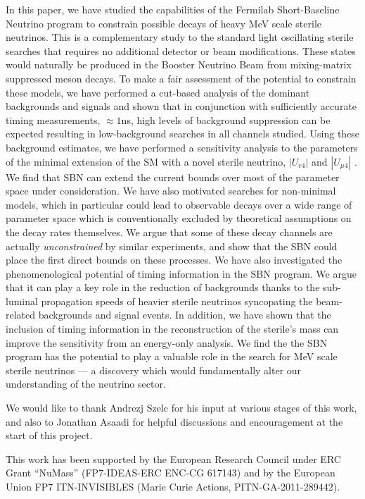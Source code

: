 \documentclass[11pt, a4paper]{article}
\begin{document}
In this paper, we have studied the capabilities of the Fermilab Short-Baseline
Neutrino program to constrain possible decays of heavy MeV scale sterile
neutrinos. This is a complementary study to the standard light oscillating
sterile searches that requires no additional detector or beam modifications.
These states would naturally be produced in the Booster Neutrino Beam from
mixing-matrix suppressed meson decays. To make a fair assessment of the
potential to constrain these models, we have performed a cut-based analysis of
the dominant backgrounds and signals and shown that in conjunction with
sufficiently accurate timing measurements, $\approx 1$ns, high levels of
background suppression can be expected resulting in low-background searches in
all channels studied. Using these background estimates, we have performed a
sensitivity analysis to the parameters of the minimal extension of the SM with
a novel sterile neutrino, $|U_{e4}|$ and $|U_{\mu4}|$ . 
%
We find that SBN can extend the current bounds over most of the parameter space
under consideration. 
%
We have also motivated searches for non-minimal models, which in particular
could lead to observable decays over a wide range of parameter space which is
conventionally excluded by theoretical assumptions on the decay rates
themselves. We argue that some of these decay channels are actually
\emph{unconstrained} by similar experiments, and show that the SBN could place
the first direct bounds on these processes.
%
We have also investigated the phenomenological potential of timing information
in the SBN program. We argue that it can play a key role in the reduction of
backgrounds thanks to the sub-luminal propagation speeds of heavier sterile
neutrinos syncopating the beam-related backgrounds and signal events. In
addition, we have shown that the inclusion of timing information in the
reconstruction of the sterile's mass can improve the sensitivity from an
energy-only analysis. 
%
We find the the SBN program has the potential to play a valuable role in the
search for MeV scale sterile neutrinos --- a discovery which would
fundamentally alter our understanding of the neutrino sector.

\acknowledgments

We would like to thank Andrezj Szelc for his input at various stages of this
work, and also to Jonathan Asaadi for helpful discussions and encouragement at
the start of this project.

This work has been supported by the European Research Council under ERC Grant
“NuMass” (FP7-IDEAS-ERC ENC-CG 617143) and by the European Union FP7
ITN-INVISIBLES (Marie Curie Actions, PITN-GA-2011-289442).
\end{document}
